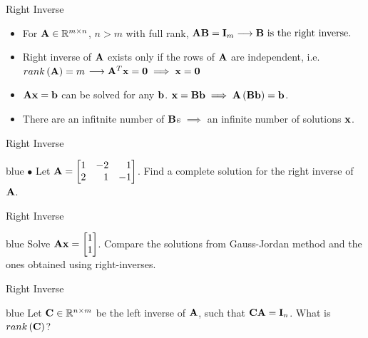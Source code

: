 \documentclass[aspectratio=169]{beamer}
\let\olditem\item
\renewcommand{\item}{\setlength{\itemsep}{\fill}\olditem}
\def\mf{\ensuremath\mathbf}
\def\mb{\ensuremath\mathbb}
\def\lp{\ensuremath\left(}
\def\rp{\ensuremath\right)}
\begin{document}
\begin{frame}[t]{Right Inverse}
\begin{itemize}
    \item For $\mf{A} \in \mb{R}^{m \times n}$, $n > m$ with full rank, $\mf{AB} = \mf{I}_m \longrightarrow \mf{B} \text{ is the right inverse.}$

    \item Right inverse of $\mf{A}$ exists only if the rows of $\mf{A}$ are independent, i.e. $rank\left(\mf{A}\right) = m$ $\longrightarrow \mf{A}^T\mf{x} = \mf{0} \implies \mf{x} = \mf{0}$

    \item $\mf{Ax} = \mf{b}$ can be solved for any $\mf{b}$. $\mf{x} = \mf{Bb} \implies \mf{A}\left(\mf{Bb}\right) = \mf{b}$. 

    \item There are an infitnite number of $\mf{B}$s $\implies$ an infinite number of solutions $\mf{x}$.
\end{itemize}
\end{frame}


\begin{frame}[t]{Right Inverse}
\begin{color}{blue}
    $\bullet$ Let $\mf{A} = \begin{bmatrix*}[r]1 & -2 & 1\\2 & 1 & -1\end{bmatrix*}$. Find a complete solution for the right inverse of $\mf{A}$.
\end{color}
\end{frame}

\begin{frame}[t]{Right Inverse}
\begin{color}{blue}
    Solve $\mf{A}\mf{x} = \begin{bmatrix*}[r]1 \\ 1\end{bmatrix*}$. Compare the solutions from Gauss-Jordan method and the ones obtained using right-inverses.
\end{color}
\end{frame}


\begin{frame}[t]{Right Inverse}
\begin{color}{blue}
    Let $\mf{C} \in \mb{R}^{n \times m}$ be the left inverse of $\mf{A}$, such that $\mf{C}\mf{A} = \mf{I}_n$. What is $rank\lp\mf{C}\rp$? 
\end{color}
\end{frame}
\end{document}
